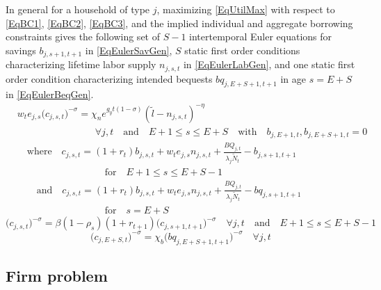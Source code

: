 \documentclass[letterpaper,12pt]{article}
\theoremstyle{definition}
\begin{document}
\begin{spacing}{1.5}
    In general for a household of type $j$, maximizing \eqref{EqUtilMax} with respect to \eqref{EqBC1}, \eqref{EqBC2}, \eqref{EqBC3}, and the implied individual and aggregate borrowing constraints gives the following set of $S-1$ intertemporal Euler equations for savings $b_{j,s+1,t+1}$ in \eqref{EqEulerSavGen}, $S$ static first order conditions characterizing lifetime labor supply $n_{j,s,t}$ in \eqref{EqEulerLabGen}, and one static first order condition characterizing intended bequests $bq_{j,E+S+1,t+1}$ in age $s=E+S$ in \eqref{EqEulerBeqGen}.
    \begin{equation}\label{EqEulerLabGen}
      \begin{split}
        &w_t e_{j,s}\bigl(c_{j,s,t}\bigr)^{-\sigma} = \chi_n e^{g_y t(1-\sigma)}(\tilde{l} - n_{j,s,t})^{-\eta} \\
        &\quad\quad\quad\quad\quad\quad\quad\quad\forall j,t \quad\text{and}\quad E+1\leq s\leq E+S \quad\text{with}\quad b_{j,E+1,t},b_{j,E+S+1,t}=0 \\
        &\quad\text{where}\quad c_{j,s,t} = \left(1+r_t\right)b_{j,s,t} + w_t e_{j,s}n_{j,s,t} + \frac{BQ_{j,t}}{\lambda_j\tilde{N}_t} - b_{j,s+1,t+1} \\
        &\quad\quad\quad\quad\quad\quad\quad\quad\quad\text{for}\quad E+1\leq s\leq E+S-1 \\
        &\quad\quad\text{and}\quad c_{j,s,t} = \left(1+r_t\right)b_{j,s,t} + w_t e_{j,s}n_{j,s,t} + \frac{BQ_{j,t}}{\lambda_j\tilde{N}_t} - bq_{j,s+1,t+1} \\
        &\quad\quad\quad\quad\quad\quad\quad\quad\quad\text{for}\quad s=E+S
      \end{split}
    \end{equation}
    \begin{equation}\label{EqEulerSavGen}
      \bigl(c_{j,s,t}\bigr)^{-\sigma} = \beta(1-\rho_s)(1+r_{t+1})\bigl(c_{j,s+1,t+1}\bigr)^{-\sigma}\quad\forall j,t \quad\text{and}\quad E+1\leq s\leq E+S-1
    \end{equation}
    \begin{equation}\label{EqEulerBeqGen}
      \bigl(c_{j,E+S,t}\bigr)^{-\sigma} = \chi_b\bigl(bq_{j,E+S+1,t+1}\bigr)^{-\sigma} \quad\forall j,t
    \end{equation}


  \subsection{Firm problem}\label{SecFirms}


\end{spacing}
\end{document}
